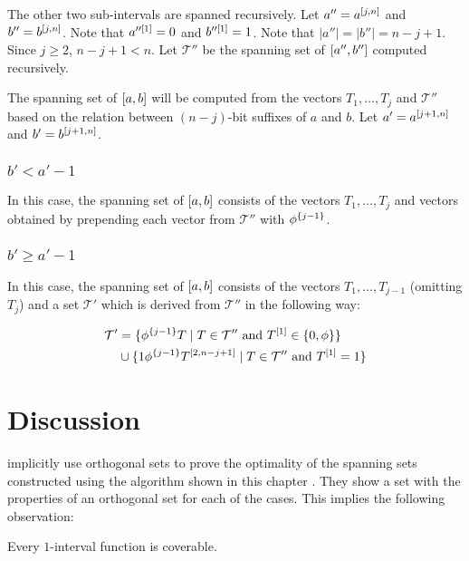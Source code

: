 The other two sub-intervals are spanned recursively.
Let $a'' = a^{[j, n]}$ and $b'' = b^{[j, n]}$.
Note that $a''^{[1]} = 0$ and $b''^{[1]} = 1$.
Note that $|a''| = |b''| = n - j + 1$.
Since $j \geq 2$, $n-j+1 < n$.
Let $\mathcal{T}''$ be the spanning set
of $[a'', b'']$ computed recursively.

The spanning set of $[a, b]$ will be computed
from the vectors $T_1, \ldots, T_j$ and $\mathcal{T}''$
based on the relation between $(n-j)$-bit suffixes of $a$
and $b$.
Let $a' = a^{[j+1, n]}$ and $b' = b^{[j+1, n]}$.

\subsubsection{\texorpdfstring
{$b' < a' - 1$}
{b' < a' - 1}
}

In this case,
the spanning set of $[a, b]$ consists
of the vectors $T_1, \ldots, T_j$ and vectors obtained
by prepending each vector from $\mathcal{T}''$ with
$\phi^{\{j-1\}}$.

\subsubsection{\texorpdfstring
{$b' \geq a' - 1$}
{b' >= a' - 1}
}

In this case,
the spanning set of $[a, b]$ consists
of the vectors $T_1, \ldots, T_{j-1}$ (omitting $T_j$)
and a set $\mathcal{T}'$ which is derived
from $\mathcal{T}''$
in the following way:

\begin{align*}
\mathcal{T}' &= \{
\phi^{\{j-1\}} T \mid T \in \mathcal{T}'' \text{ and }
T^{[1]} \in \{0, \phi\}
\} \\
&\cup \{
1 \phi^{\{j-1\}} T^{[2, n-j+1]} \mid T \in \mathcal{T}''
\text{ and } T^{[1]} = 1
\}
\end{align*}


\section{Discussion}
\label{sec:1intervaldiscussion}

\citeauthor{Schieber2005154} implicitly use
orthogonal sets
to prove the optimality
of the spanning sets
constructed using the algorithm shown in this chapter
\citep[Theorem 3]{Schieber2005154}.
They show a set with the properties of an orthogonal set
for each of the cases.
This implies the following observation:
\begin{observation}
\label{observation:1intervalcoverable}
Every $1$-interval function is coverable.
\end{observation}

